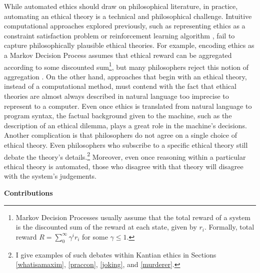 \begin{isabellebody}
\begin{isamarkuptext}
While automated ethics should draw on philosophical literature, in practice, automating an ethical 
theory is a technical and philosophical challenge. Intuitive computational approaches explored 
previously, such as representing ethics as a constraint satisfaction problem \citep{csp} or reinforcement 
learning algorithm \citep{util1}, fail to capture philosophically plausible ethical theories. For 
example, encoding ethics as a Markov Decision Process assumes that ethical reward can be aggregated 
according to some discounted sum\footnote{Markov Decision Processes usually assume that the total
reward of a system is the discounted sum of the reward at each state, given by $r_i$. Formally, total
reward $R=\sum_0^{\infty}\gamma^ir_i$ for some $\gamma \leq 1$.}, but many philosophers reject 
this notion of aggregation \citep{consequentialismsep}. 
On the other hand, approaches that begin with an ethical theory, instead of a computational method, must contend with the 
fact that ethical theories are almost always described in natural language too
imprecise to represent to a computer. Even once ethics is translated from natural 
language to program syntax, the factual background given to the machine, such as the description of 
an ethical dilemma, plays a great role in the machine's decisions. Another complication
is that philosophers do not agree on a single choice of ethical theory. Even philosophers who
subscribe to a specific ethical theory still debate the theory's 
details.\footnote{I give examples of such debates within Kantian ethics in Sections \ref{whatisamaxim}, 
\ref{praccon}, \ref{joking}, and \ref{murderer}.} Moreover, even once reasoning within a 
particular ethical theory is automated, those who disagree with that theory will disagree with the 
system's judgements.

\medskip 

\noindent \textbf{Contributions}

\medskip 


\end{isamarkuptext}
\end{isabellebody}
